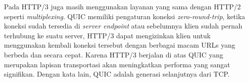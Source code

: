 Pada HTTP/3 juga masih menggunakan layanan yang sama dengan HTTP/2 seperti \emph{multiplexing}. QUIC memiliki pengaturan koneksi \emph{zero-round-trip}, ketika koneksi sudah tersedia di \emph{server endpoint} atau sebelumnya klien sudah pernah terhubung ke suatu server, HTTP/3 dapat mengizinkan klien untuk menggunakan kembali koneksi tersebut dengan berbagai macam URLs yang berbeda dan secara cepat. Karena HTTP/3 berjalan di atas QUIC yang merupakan lapisan transportasi akan meningkatkan performa yang sangat signifikan. Dengan kata lain, QUIC adalah generasi selanjutnya dari TCP.





